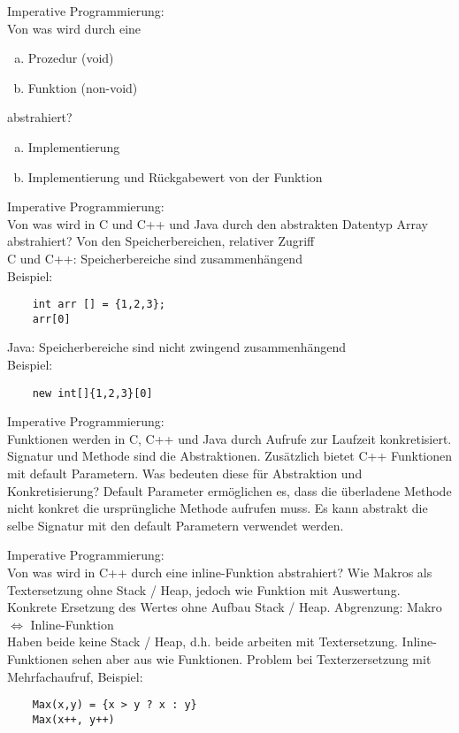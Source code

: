 \begin{card}
	Imperative Programmierung:\\
	Von was wird durch eine 
	\begin{enumerate}[a)]
	\item Prozedur (void)
	\item Funktion (non-void)
	\end{enumerate}
	abstrahiert?
	\hr
	\begin{enumerate}[a)]
	\item Implementierung
	\item Implementierung und Rückgabewert von der Funktion
	\end{enumerate}
\end{card}

\begin{card}
	Imperative Programmierung:\\
	Von was wird in C und C++ und Java durch den abstrakten Datentyp Array abstrahiert?
	\hr
	Von den Speicherbereichen, relativer Zugriff\\
	C und C++: Speicherbereiche sind zusammenhängend\\
	Beispiel: 
	\begin{lstlisting}
	int arr [] = {1,2,3};
	arr[0]
	\end{lstlisting}
	
	Java: Speicherbereiche sind nicht zwingend zusammenhängend\\
	Beispiel: 
	\begin{lstlisting}
	new int[]{1,2,3}[0]
	\end{lstlisting}
	
\end{card}

\begin{card}
	Imperative Programmierung:\\
	Funktionen werden in C, C++ und Java durch Aufrufe zur Laufzeit konkretisiert. Signatur und Methode sind die Abstraktionen. Zusätzlich bietet C++ Funktionen mit default Parametern. Was bedeuten diese für Abstraktion und Konkretisierung?
	\hr
	Default Parameter ermöglichen es, dass die überladene Methode nicht konkret die ursprüngliche Methode aufrufen muss. Es kann abstrakt die selbe Signatur mit den default Parametern verwendet werden.
\end{card}

\begin{card}
	Imperative Programmierung:\\
	Von was wird in C++ durch eine inline-Funktion abstrahiert?
	\hr
	Wie Makros als Textersetzung ohne Stack / Heap, jedoch wie Funktion mit Auswertung.
	Konkrete Ersetzung des Wertes ohne Aufbau Stack / Heap.
	\vfill
	Abgrenzung: Makro $\Leftrightarrow$ Inline-Funktion\\
	Haben beide keine Stack / Heap, d.h. beide arbeiten mit Textersetzung. Inline-Funktionen sehen aber aus wie Funktionen. 
	Problem bei Texterzersetzung mit Mehrfachaufruf, Beispiel: 
	\begin{lstlisting}
	Max(x,y) = {x > y ? x : y}
	Max(x++, y++)
	\end{lstlisting}
\end{card}

